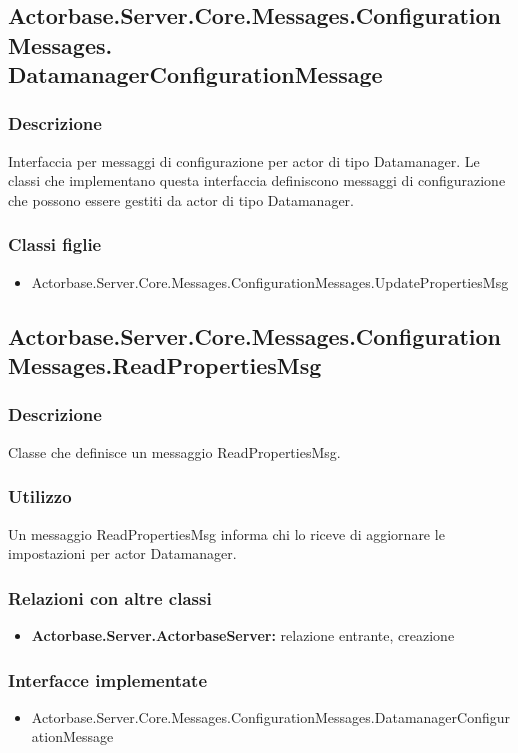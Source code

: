 \documentclass[a4paper]{article}
\begin{document}
			\subsection{Actorbase.Server.Core.Messages.ConfigurationMessages.\\ DatamanagerConfigurationMessage}
			\subsubsection{Descrizione}
				Interfaccia per messaggi di configurazione per actor di tipo Datamanager. 
				Le classi che implementano questa interfaccia definiscono messaggi di configurazione che possono essere gestiti da actor di tipo Datamanager.
			\subsubsection{Classi figlie}
			\begin{itemize}
				\item Actorbase.Server.Core.Messages.ConfigurationMessages.UpdatePropertiesMsg
			\end{itemize}

			\subsection{Actorbase.Server.Core.Messages.ConfigurationMessages.ReadPropertiesMsg}
			\subsubsection{Descrizione}
				Classe che definisce un messaggio ReadPropertiesMsg.
			\subsubsection{Utilizzo}
				Un messaggio ReadPropertiesMsg informa chi lo riceve di aggiornare le impostazioni per actor Datamanager.
			\subsubsection{Relazioni con altre classi}
			\begin{itemize}
				\item \textbf{Actorbase.Server.ActorbaseServer:} relazione entrante, creazione
			\end{itemize}
			\subsubsection{Interfacce implementate}
			\begin{itemize}
				\item Actorbase.Server.Core.Messages.ConfigurationMessages.DatamanagerConfigurationMessage
			\end{itemize}
			
\end{document}
